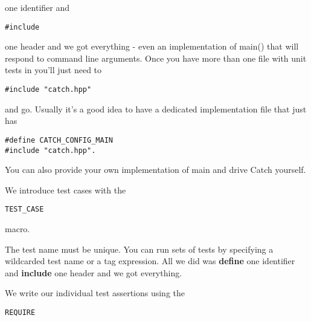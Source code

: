 \documentclass[%
oneside,                 %
final,                   %
10pt]{article}
\begin{document}
one identifier and 


\begin{verbatim}
#include 

\end{verbatim}

one header and we got everything - even an implementation of main() that will respond to command line arguments. 
Once you have more than one file with unit tests in you'll just need to 


\begin{verbatim}
#include "catch.hpp" 

\end{verbatim}

and go. Usually it's a good idea to have a dedicated implementation file that just has 



\begin{verbatim}
#define CATCH_CONFIG_MAIN 
#include "catch.hpp". 

\end{verbatim}

You can also provide your own implementation of main and drive Catch yourself.

We introduce test cases with the 


\begin{verbatim}
TEST_CASE 

\end{verbatim}

macro.

The test name must be unique. You can run sets of tests by specifying a wildcarded test name or a tag expression. 
All we did was \textbf{define} one identifier and \textbf{include} one header and we got everything.

We write our individual test assertions using the 


\begin{verbatim}
REQUIRE 

\end{verbatim}
\end{document}
